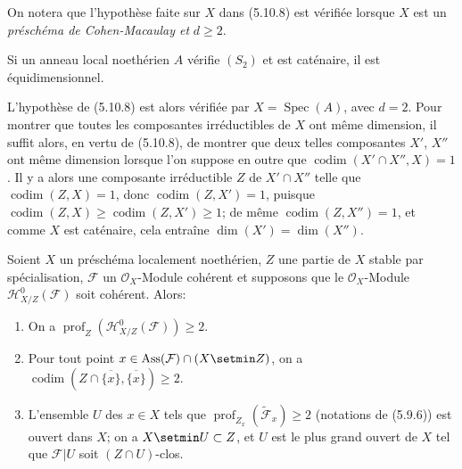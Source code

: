 On notera que l'hypothèse faite sur $X$ dans (5.10.8) est vérifiée lorsque $X$
est un \emph{préschéma de Cohen-Macaulay et} $d\geq2$.

\begin{corollary}[5.10.9]
\label{IV.2.s5.10.9-fr}
Si un anneau local noethérien $A$ vérifie $(S_2)$ et est caténaire, il est
équidimensionnel.
\end{corollary}

L'hypothèse de (5.10.8) est alors vérifiée par $X=\operatorname{Spec}(A)$,
avec $d=2$. Pour montrer que toutes les composantes irréductibles de $X$ ont
même dimension, il suffit alors, en vertu de (5.10.8), de montrer que deux
telles composantes $X'$, $X''$ ont même dimension lorsque l'on suppose en
outre que $\operatorname{codim}(X'\cap X'',X)=1$. Il y a alors une composante
irréductible $Z$ de $X'\cap X''$ telle que
$\operatorname{codim}(Z,X)=1$, donc $\operatorname{codim}(Z,X')=1$, puisque
$\operatorname{codim}(Z,X)\geq\operatorname{codim}(Z,X')\geq1$; de même
$\operatorname{codim}(Z,X'')=1$, et comme $X$ est caténaire, cela entraîne
$\dim(X')=\dim(X'')$.

\begin{proposition}[5.10.10]
\label{IV.2.s5.10.10-fr}
Soient $X$ un préschéma localement noethérien, $Z$ une partie de $X$ stable
par spécialisation, $\mathcal F$ un $\mathcal O_X$-Module cohérent et supposons
que le $\mathcal O_X$-Module $\mathcal H^0_{X/Z}(\mathcal F)$ soit cohérent.
Alors:
\begin{enumerate}
\item[\textup{(i)}] On a
$\operatorname{prof}_Z(\mathcal H^0_{X/Z}(\mathcal F))\geq2$.
\item[\textup{(ii)}] Pour tout point
$x\in\operatorname{Ass}(\mathcal F)\cap(X\setmin Z)$, on a
$\operatorname{codim}(Z\cap\overline{\{x\}},\overline{\{x\}})\geq2$.
\item[\textup{(iii)}] L'ensemble $U$ des $x\in X$ tels que
$\operatorname{prof}_{Z_x}(\widetilde{\mathcal F}_x)\geq2$ \textup{(notations de
(5.9.6))} est ouvert dans $X$; on a $X\setmin U\subset Z$, et $U$ est le plus grand
ouvert de $X$ tel que $\mathcal F|U$ soit $(Z\cap U)$-clos.
\end{enumerate}
\end{proposition}


